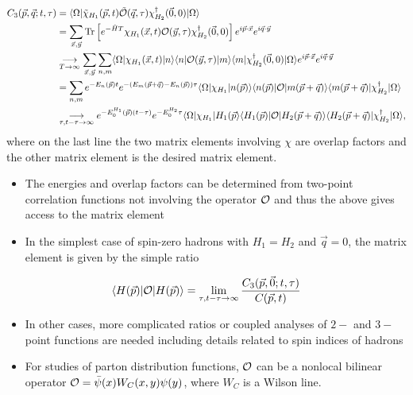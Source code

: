 \begin{align}
    C_3(\vec{p}, \vec{q}; t, \tau) &= \langle \Omega | \tilde{\chi}_{H_1}(\vec{p}, t) \tilde{{\cal O}}(\vec{q}, \tau) \chi_{H_2}^\dagger(\vec{0}, 0) | \Omega \rangle \nonumber \\
    &= \sum_{\vec{x}, \vec{y}}\operatorname{Tr}\left [ e^{-\hat{H}T} \chi_{H_1}(\vec{x}, t) {\cal O}(\vec{y}, \tau) \chi^\dagger_{H_2}(\vec{0}, 0) \right] e^{i \vec{p} \cdot \vec{x}} e^{i \vec{q} \cdot \vec{y}} \nonumber \\
    &\underset{T \to \infty}{\longrightarrow} \sum_{\vec{x}, \vec{y}} \sum_{n,m} \langle \Omega | \chi_{H_1}(\vec{x}, t) | n \rangle \langle n | {\cal O}(\vec{y}, \tau) | m \rangle \langle m | \chi_{H_2}^\dagger(\vec{0}, 0 ) | \Omega \rangle e^{i \vec{p} \cdot \vec{x}} e^{i \vec{q} \cdot \vec{y}} \nonumber \\
    &= \sum_{n,m}e^{-E_n(\vec{p}) t}e^{-(E_m(\vec{p} + \vec{q}) - E_n(\vec{p})) \tau} \langle \Omega | \chi_{H_1} | n(\vec{p})\rangle \langle n(\vec{p}) | {\cal O} | m(\vec{p}+ \vec{q})\rangle \langle m(\vec{p} + \vec{q}) | \chi_{H_2}^\dagger | \Omega \rangle \nonumber \\
    &\underset{\tau, t-\tau \to \infty}{\longrightarrow}e^{-E_0^{H_1}(\vec{p})(t-\tau)} e^{-E_0^{H_2}\tau} \langle \Omega | \chi_{H_1} | H_1(\vec{p} \rangle \langle H_1(\vec{p}) | {\cal O} | H_2(\vec{p}+\vec{q}) \rangle \langle H_2(\vec{p}+\vec{q}) | \chi_{H_2}^\dagger | \Omega \rangle,
\end{align}
where on the last line the two matrix elements involving $\chi$ are overlap factors and the other matrix element is the desired matrix element.
\begin{itemize}
    \item The energies and overlap factors can be determined from two-point correlation functions not involving the operator ${\cal O}$ and thus the above gives access to the matrix element
    \item In the simplest case of spin-zero hadrons with $H_1 = H_2$ and $\vec{q} = 0$, the matrix element is given by the simple ratio
\end{itemize}
\begin{equation}
    \langle H(\vec{p}) | {\cal O} | H(\vec{p}) \rangle = \lim_{\tau, t-\tau \to \infty}\frac{C_3(\vec{p}, \vec{0};t,\tau)}{C(\vec{p},t)}
\end{equation}
\begin{itemize}
    \item In other cases, more complicated ratios or coupled analyses of $2-$ and $3-$point functions are needed including details related to spin indices of hadrons
    \item For studies of parton distribution functions, ${\cal O}$ can be a nonlocal bilinear operator ${\cal O} = \bar{\psi}(x) W_C(x,y) \psi(y)$, where $W_C$ is a Wilson line.
\end{itemize}

